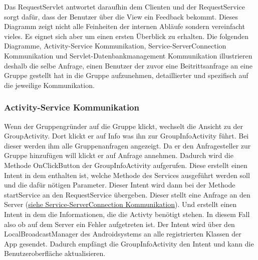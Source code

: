 Das RequestServlet antwortet daraufhin dem Clienten und der RequestService sorgt dafür, dass der Benutzer über die View ein Feedback bekommt. \newline
Dieses Diagramm zeigt nicht alle Feinheiten der internen Abläufe sondern vereinfacht vieles. Es eignet sich aber um einen ersten Überblick zu erhalten.
Die folgenden Diagramme, Activity-Service Kommunikation, Service-ServerConnection Kommunikation und Servlet-Datenbankmanagement Kommunikation illustrieren deshalb die selbe Anfrage, einen Benutzer der zuvor eine Beitrittsanfrage an eine Gruppe gestellt hat in die Gruppe aufzunehmen, detaillierter und spezifisch auf die jeweilige Kommunikation.
\newpage
\subsubsection{Activity-Service Kommunikation}

\begin {center}
\end {center}
	Wenn der Gruppengründer auf die Gruppe klickt, wechselt die Ansicht zu der GroupActivity. Dort klickt er auf Info was ihn zur GroupInfoActivity führt. Bei dieser werden ihm alle Gruppenanfragen angezeigt. Da er den Anfragesteller zur Gruppe  hinzufügen will klickt er auf Anfrage annehmen. Dadurch wird die Methode OnClickButton der GroupInfoActivity aufgerufen. Diese erstellt einen Intent in dem enthalten ist, welche Methode des Services ausgeführt werden soll und die dafür nötigen Parameter. 
Dieser Intent wird dann bei der Methode startService an den RequestService übergeben. Dieser stellt eine Anfrage an den Server (\hyperlink{ServiceServerConnection}{siehe Service-ServerConnection Kommunikation}). Und erstellt einen Intent in dem die Informationen, die die Activty benötigt stehen. In diesem Fall also ob auf dem Server ein Fehler aufgetreten ist.
Der Intent wird über den LocalBroadcastManager des Androidsystems an alle registrierten Klassen der App gesendet. Dadurch empfängt die GroupInfoActivity den Intent und kann die Benutzeroberfläche aktualisieren.


